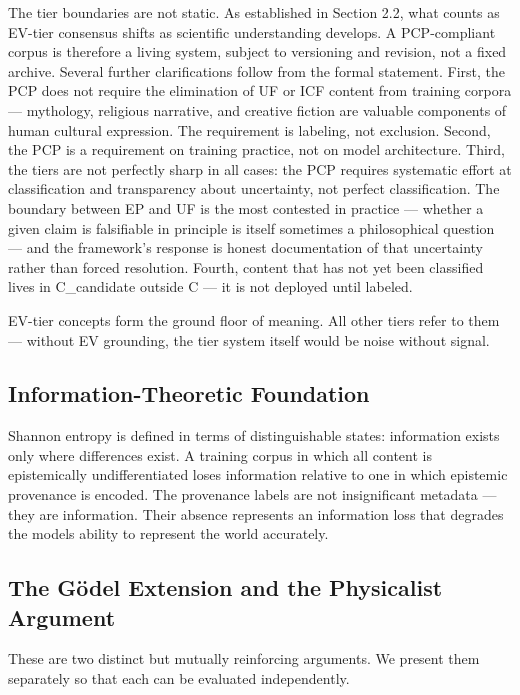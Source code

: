\documentclass[12pt]{article}
\begin{document}
The tier boundaries are not static. As established in Section 2.2, what
counts as EV-tier consensus shifts as scientific understanding develops.
A PCP-compliant corpus is therefore a living system, subject to
versioning and revision, not a fixed archive. Several further
clarifications follow from the formal statement. First, the PCP does not
require the elimination of UF or ICF content from training corpora ---
mythology, religious narrative, and creative fiction are valuable
components of human cultural expression. The requirement is labeling,
not exclusion. Second, the PCP is a requirement on training practice,
not on model architecture. Third, the tiers are not perfectly sharp in
all cases: the PCP requires systematic effort at classification and
transparency about uncertainty, not perfect classification. The boundary
between EP and UF is the most contested in practice --- whether a given
claim is falsifiable in principle is itself sometimes a philosophical
question --- and the framework's response is honest documentation of
that uncertainty rather than forced resolution. Fourth, content that has
not yet been classified lives in C\_candidate outside C --- it is not
deployed until labeled.

EV-tier concepts form the ground floor of meaning. All other tiers refer
to them --- without EV grounding, the tier system itself would be noise
without signal.

\subsection{Information-Theoretic Foundation}\label{information-theoretic-foundation}

Shannon entropy is defined in terms of distinguishable states:
information exists only where differences exist. A training corpus in
which all content is epistemically undifferentiated loses information
relative to one in which epistemic provenance is encoded. The provenance
labels are not insignificant metadata --- they are information. Their
absence represents an information loss that degrades the
model\textquotesingle s ability to represent the world accurately.

\subsection{The Gödel Extension and the Physicalist Argument}\label{the-guxf6del-extension-and-the-physicalist-argument}

These are two distinct but mutually reinforcing arguments. We present
them separately so that each can be evaluated independently.
\end{document}
